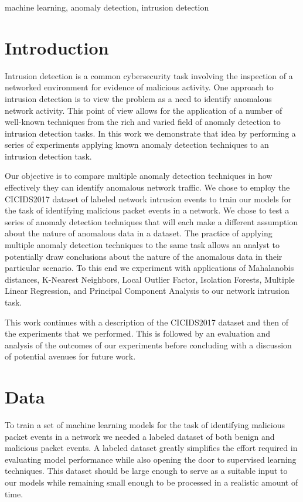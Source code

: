 \documentclass[conference]{IEEEtran}
\begin{document}
\begin{IEEEkeywords}
machine learning, anomaly detection, intrusion detection
\end{IEEEkeywords}

\section{Introduction}

Intrusion detection is a common cybersecurity task involving the inspection of a networked environment for evidence of malicious activity. One approach to intrusion detection is to view the problem as a need to identify anomalous network activity. This point of view allows for the application of a number of well-known techniques from the rich and varied field of anomaly detection to intrusion detection tasks. In this work we demonstrate that idea by performing a series of experiments applying known anomaly detection techniques to an intrusion detection task.

Our objective is to compare multiple anomaly detection techniques in how effectively they can identify anomalous network traffic. We chose to employ the CICIDS2017 dataset of labeled network intrusion events to train our models for the task of identifying malicious packet events in a network. We chose to test a series of anomaly detection techniques that will each make a different assumption about the nature of anomalous data in a dataset. The practice of applying multiple anomaly detection techniques to the same task allows an analyst to potentially draw conclusions about the nature of the anomalous data in their particular scenario. To this end we experiment with applications of Mahalanobis distances, K-Nearest Neighbors, Local Outlier Factor, Isolation Forests, Multiple Linear Regression, and Principal Component Analysis to our network intrusion task.

This work continues with a description of the CICIDS2017 dataset and then of the experiments that we performed. This is followed by an evaluation and analysis of the outcomes of our experiments before concluding with a discussion of potential avenues for future work.

\section{Data}

To train a set of machine learning models for the task of identifying malicious packet events in a network we needed a labeled dataset of both benign and malicious packet events. A labeled dataset greatly simplifies the effort required in evaluating model performance while also opening the door to supervised learning techniques. This dataset should be large enough to serve as a suitable input to our models while remaining small enough to be processed in a realistic amount of time.
\end{document}

